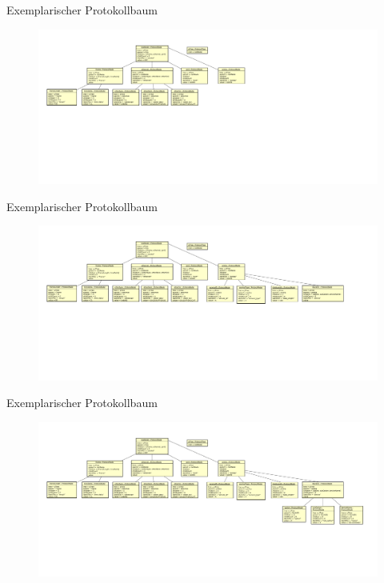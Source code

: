 \begin{frame}{Exemplarischer Protokollbaum}
    \begin{figure}
    	\centering
    	\includegraphics[width=\textwidth]{./images/prototree/3.pdf}
    \end{figure}
\end{frame}

\begin{frame}{Exemplarischer Protokollbaum}
    \begin{figure}
    	\centering
    	\includegraphics[width=\textwidth]{./images/prototree/2.pdf}
    \end{figure}
\end{frame}

\begin{frame}{Exemplarischer Protokollbaum}
    \begin{figure}
    	\centering
    	\includegraphics[width=\textwidth]{./images/prototree/1.pdf}
    \end{figure}
\end{frame}